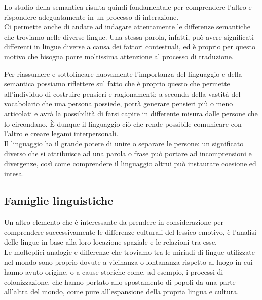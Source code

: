 Lo studio della semantica risulta quindi fondamentale per comprendere l'altro e rispondere adeguatamente in un processo di interazione.\\
Ci permette anche di andare ad indagare attentamente le differenze semantiche che troviamo nelle diverse lingue. Una stessa parola, infatti, può avere significati differenti in lingue diverse a causa dei fattori contestuali, ed è proprio per questo motivo che bisogna porre moltissima attenzione al processo di traduzione.  

Per riassumere e sottolineare nuovamente l'importanza del linguaggio e della semantica possiamo riflettere sul fatto che è proprio questo che permette all'individuo di costruire pensieri e ragionamenti: a seconda della vastità del vocabolario che una persona possiede, potrà generare pensieri più o meno articolati e avrà la possibilità di farsi capire in differente misura dalle persone che lo circondano. È dunque il linguaggio ciò che rende possibile comunicare con l'altro e creare legami interpersonali.\\
Il linguaggio ha il grande potere di unire o separare le persone: un significato diverso che si attribuisce ad una parola o frase può portare ad incomprensioni e divergenze, così come comprendere il linguaggio altrui può instaurare coesione ed intesa.

\subsection{Famiglie linguistiche}
Un altro elemento che è interessante da prendere in considerazione per comprendere successivamente le differenze culturali del lessico emotivo, è l'analisi delle lingue in base alla loro locazione spaziale e le relazioni tra esse.\\
Le molteplici analogie e differenze che troviamo tra le miriadi di lingue utilizzate nel mondo sono proprio dovute a vicinanza o lontananza rispetto al luogo in cui hanno avuto origine, o a cause storiche come, ad esempio, i processi di colonizzazione, che hanno portato allo spostamento di popoli da una parte all'altra del mondo, come pure all'espansione della propria lingua e cultura. 

